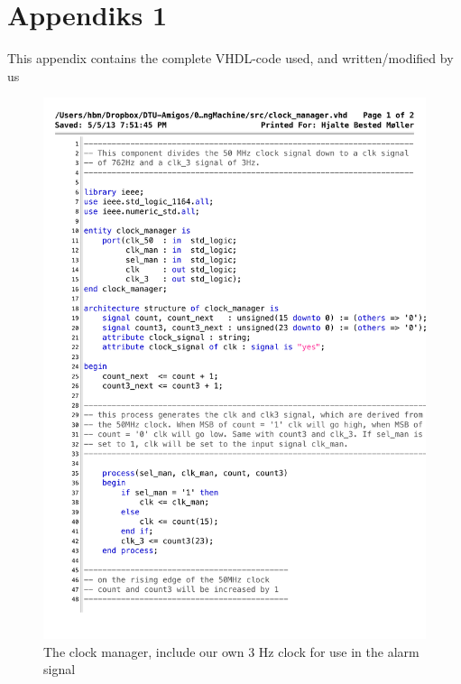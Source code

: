 \chapter{Appendiks 1}

This appendix contains the complete VHDL-code used, and written/modified by us

\begin{figure}[h!]
\centering
\includegraphics[scale=0.7]{figs/clock_manager.pdf} 
\caption{The clock manager, include our own 3 Hz clock for use in the alarm signal}
\label{vhd:clockman1}
\end{figure}

